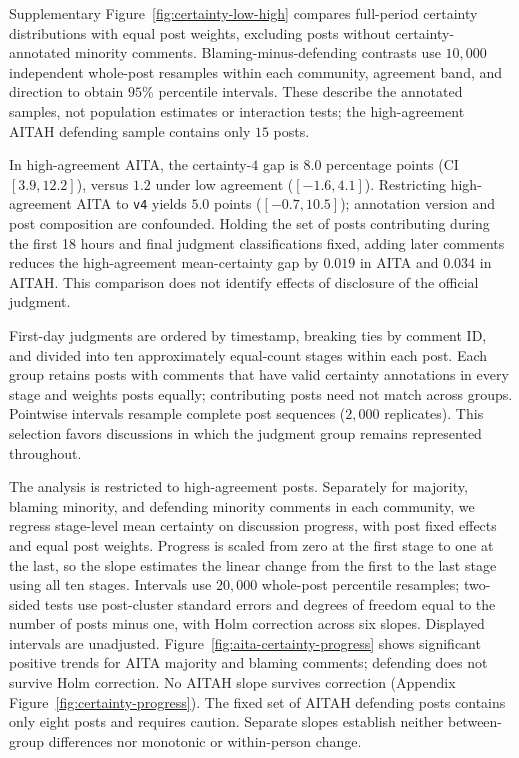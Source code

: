 Supplementary Figure~\ref{fig:certainty-low-high} compares full-period certainty
distributions with equal post weights, excluding posts without
certainty-annotated minority comments. Blaming-minus-defending contrasts use $10{,}000$
independent whole-post resamples within each community, agreement band,
and direction to obtain $95\%$ percentile intervals. These describe the
annotated samples, not population estimates or interaction tests; the
high-agreement AITAH defending sample contains only $15$ posts.

In high-agreement AITA, the certainty-$4$ gap is $8.0$ percentage points
(CI $[3.9,12.2]$), versus $1.2$ under low agreement ($[-1.6,4.1]$).
Restricting high-agreement AITA to \texttt{v4} yields $5.0$ points
($[-0.7,10.5]$); annotation version and post composition are confounded.
Holding the set of posts contributing during the first 18 hours and final judgment classifications
fixed, adding later comments reduces the high-agreement mean-certainty
gap by $0.019$ in AITA and $0.034$ in AITAH. This comparison does not
identify effects of disclosure of the official judgment.



First-day judgments are ordered by timestamp, breaking ties by comment ID,
and divided into ten approximately equal-count stages within each post.
Each group retains posts with comments that have valid certainty annotations
in every stage and weights posts equally; contributing posts need not match
across groups. Pointwise intervals resample complete post sequences
($2{,}000$ replicates). This selection favors discussions in which the
judgment group remains represented throughout.

The analysis is restricted to high-agreement posts. Separately for
majority, blaming minority, and defending minority
comments in each community, we regress stage-level mean certainty on
discussion progress, with post fixed effects and equal post weights.
Progress is scaled from zero at the first stage to one at the last, so
the slope estimates the linear change from the first to the last stage
using all ten stages. Intervals use $20{,}000$ whole-post percentile
resamples; two-sided tests use post-cluster standard errors and degrees
of freedom equal to the number of posts minus one, with Holm correction
across six slopes.
Displayed intervals are unadjusted.
Figure~\ref{fig:aita-certainty-progress} shows significant positive trends
for AITA majority and blaming comments; defending does not survive Holm
correction. No AITAH slope survives correction (Appendix Figure~\ref{fig:certainty-progress}).
The fixed set of AITAH defending posts contains only eight posts and requires caution.
Separate slopes establish neither between-group differences nor monotonic
or within-person change.

